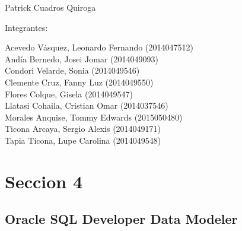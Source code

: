 \documentclass[12pt,letterpaper]{article}
\begin{document}
\begin{titlepage}
\begin{center}
\vspace*{0.1in}
\begin{large}
 Patrick Cuadros Quiroga\\
\end{large}

\vspace*{0.2in}
\vspace*{0.1in}
\begin{large}
Integrantes: \\
\begin{flushleft}
Acevedo Vásquez, Leonardo Fernando 	(2014047512) \\
Andía Bernedo, Josei Jomar 			(2014049093) \\
Condori Velarde, Sonia          	(2014049546) \\
Clemente Cruz, Fanny Luz    		(2014049550) \\
Flores Colque, Gisela           	(2014049547) \\
Llatasi Cohaila, Cristian Omar		(2014037546) \\
Morales Anquise, Tommy Edwards 		(2015050480) \\
Ticona Arcaya, Sergio Alexis		(2014049171) \\
Tapia Ticona, Lupe Carolina			(2014049548) \\
\end{flushleft}
\end{large}
\end{center}

\end{titlepage}




 \tableofcontents
 \newpage



\section{Seccion 4} 
\subsection{Oracle SQL Developer Data Modeler}
\end{document}
